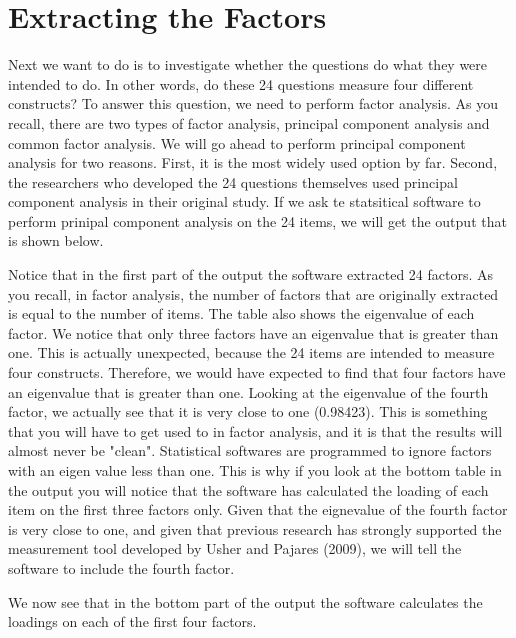 \documentclass[a4paper,12pt,oneside]{book}
\begin{document}
\section{Extracting the Factors}
Next we want to do is to investigate whether the questions do what they were intended to do. In other words, do these 24 questions
measure four different constructs? To answer this question, we need to perform factor analysis. As you recall, there are two types of factor analysis,
principal component analysis and common factor analysis. We will go ahead to perform principal component analysis for two reasons. First, it is
the most widely used option by far. Second, the researchers who developed the 24 questions themselves used principal component analysis in their
original study. If we ask te statsitical software to perform prinipal component analysis on the 24 items, we will get the output that is shown
below. 

\begin{stlog}\end{stlog}

Notice that in the first part of the output the software extracted 24 factors. As you recall, in factor analysis, the number of factors that are 
originally extracted is equal to the number of items. The table also shows the eigenvalue of each factor. We notice that only three factors have an
eigenvalue that is greater than one. This is actually unexpected, because the 24 items are intended to measure four constructs. Therefore, we would
have expected to find that four factors have an eigenvalue that is greater than one. Looking at the eigenvalue of the fourth factor, we actually see
that it is very close to one (0.98423). This is something that you will have to get used to in factor analysis, and it is that the results will
almost never be "clean". Statistical softwares are programmed to ignore factors with an eigen value less than one. This is why if you look at the
bottom table in the output you will notice that the software has calculated the loading of each item on the first three factors only. Given that the
eignevalue of the fourth factor is very close to one, and given that previous research has strongly supported the measurement tool developed by
Usher and Pajares (2009), we will tell the software to include the fourth factor.

\begin{stlog}\end{stlog}

We now see that in the bottom part of the output the software calculates the loadings on each of the first four factors. 
\end{document}
